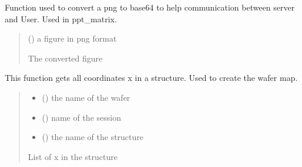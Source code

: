 \documentclass[letterpaper,10pt,english]{sphinxmanual}
\begin{document}
\begin{fulllineitems}
\label{\detokenize{VBD:VBD.fig_to_base64}}
\pysigstartsignatures
{}
\pysigstopsignatures
\sphinxAtStartPar
Function used to convert a png to base64 to help communication between server and User. Used in ppt\_matrix.
\begin{quote}\begin{description}
\sphinxAtStartPar
{} () \textendash{} a figure in png format

\sphinxAtStartPar
The converted figure

\end{description}\end{quote}

\end{fulllineitems}


\begin{fulllineitems}
\label{\detokenize{VBD:VBD.get_all_x}}
\pysigstartsignatures
{}
\pysigstopsignatures
\sphinxAtStartPar
This function gets all coordinates x in a structure. Used to create the wafer map.
\begin{quote}\begin{description}
\begin{itemize}
\item {} 
\sphinxAtStartPar
{} () \textendash{} the name of the wafer

\item {} 
\sphinxAtStartPar
{} () \textendash{} name of the session

\item {} 
\sphinxAtStartPar
{} () \textendash{} the name of the structure

\end{itemize}

\sphinxAtStartPar
List of x in the structure

\end{description}\end{quote}

\end{fulllineitems}
\end{document}
